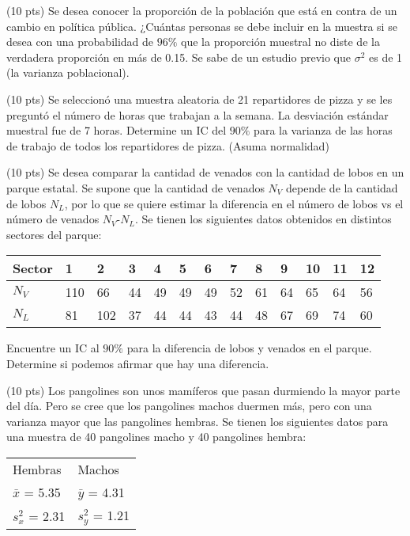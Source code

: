 \documentclass[addpoints]{exam}
\theoremstyle{mytheor}
\begin{document}
\begin{questions}
\question (10 pts) Se desea conocer la proporción de la población que está en contra de un cambio en política pública. ¿Cuántas personas se debe incluir en la muestra si se desea con una probabilidad de $96\%$ que la proporción muestral no diste de la verdadera proporción en más de 0.15. Se sabe de un estudio previo que $\sigma^2$ es de 1 (la varianza poblacional).  

\question (10 pts) Se seleccionó una muestra aleatoria de 21 repartidores de pizza y se les preguntó el número de horas que trabajan a la semana. La desviación estándar muestral fue de 7 horas. Determine un IC del $90\%$ para la varianza de las horas de trabajo de todos los repartidores de pizza. (Asuma normalidad)

\question (10 pts) Se desea comparar la cantidad de venados con la cantidad de lobos en un parque estatal. Se supone que la cantidad de venados $N_V$ depende de la cantidad de lobos $N_L$, por lo que se quiere estimar la diferencia en el número de lobos vs el número de venados $N_V$-$N_L$. Se tienen los siguientes datos obtenidos en distintos sectores del parque:

\begin{table}[h]
\centering
\begin{tabular}{lllllllllllll}
Sector & 1 & 2 & 3 & 4 & 5 & 6 & 7 & 8 & 9 & 10 & 11 & 12 \\ \hline
$N_V$ & 110 & 66 & 44 & 49 & 49 & 49 & 52 & 61 & 64 & 65 & 64 & 56 \\
$N_L$ & 81 & 102 & 37 & 44 & 44 & 43 & 44 & 48 & 67 & 69 & 74 & 60
\end{tabular}
\end{table}

Encuentre un IC al $90\%$ para la diferencia de lobos y venados en el parque. Determine si podemos afirmar que hay una diferencia. 

\question (10 pts)
Los pangolines son unos mamíferos que pasan durmiendo la mayor parte del día. Pero se cree que los pangolines machos duermen más, pero con una varianza mayor que las pangolines hembras. Se tienen los siguientes datos para una muestra de 40 pangolines macho y 40 pangolines hembra:

\begin{table}[h]
\centering
\begin{tabular}{ll}
Hembras & Machos \\
$\bar{x}$ = 5.35 & $\bar{y}$ = 4.31 \\
$s_x^2$ = 2.31 & $s_y^2$ = 1.21
\end{tabular}
\end{table}


\end{questions}
\end{document}
